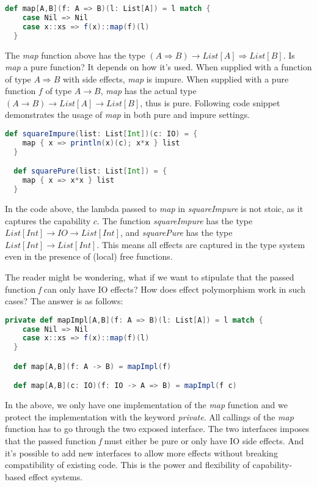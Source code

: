 \begin{lstlisting}[language=Scala]
  def map[A,B](f: A => B)(l: List[A]) = l match {
    case Nil => Nil
    case x::xs => f(x)::map(f)(l)
  }
\end{lstlisting}

The \emph{map} function above has the type
$(A \Rightarrow B) \to List[A] \Rightarrow List[B]$. Is \emph{map} a
pure function? It depends on how it's used. When supplied with a
function of type $A \Rightarrow B$ with side effects, \emph{map} is
impure. When supplied with a pure function $f$ of type $A \to B$,
\emph{map} has the actual type $(A \to B) \to List [A] \to List[B]$,
thus is pure. Following code snippet demonstrates the usage of
\emph{map} in both pure and impure settings.

\begin{lstlisting}[language=Scala]
  def squareImpure(list: List[Int])(c: IO) = {
    map { x => println(x)(c); x*x } list
  }

  def squarePure(list: List[Int]) = {
    map { x => x*x } list
  }
\end{lstlisting}

In the code above, the lambda passed to \emph{map} in
\emph{squareImpure} is not stoic, as it captures the capability
$c$. The function \emph{squareImpure} has the type
$List[Int] \to IO \to List[Int]$, and \emph{squarePure} has the type
$List[Int] \to List[Int]$. This means all effects are captured in the
type system even in the presence of (local) free functions.

The reader might be wondering, what if we want to stipulate that the
passed function \emph{f} can only have IO effects? How does effect
polymorphism work in such cases? The answer is as follows:

\begin{lstlisting}[language=Scala]
  private def mapImpl[A,B](f: A => B)(l: List[A]) = l match {
    case Nil => Nil
    case x::xs => f(x)::map(f)(l)
  }

  def map[A,B](f: A -> B) = mapImpl(f)

  def map[A,B](c: IO)(f: IO -> A => B) = mapImpl(f c)
\end{lstlisting}

In the above, we only have one implementation of the \emph{map}
function and we protect the implementation with the keyword
\emph{private}. All callings of the \emph{map} function has to go
through the two exposed interface. The two interfaces imposes that the
passed function \emph{f} must either be pure or only have IO side
effects. And it's possible to add new interfaces to allow more effects
without breaking compatibility of existing code. This is the power and
flexibility of capability-based effect systems.
